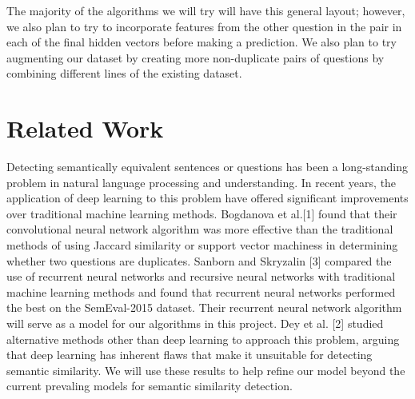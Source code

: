 \documentclass{article}
\begin{document}
\begin{center}
\end{center}
The majority of the algorithms we will try will have this general layout; however, we also plan to try to incorporate features from the other question in the pair in each of the final hidden vectors before making a prediction. We also plan to try augmenting our dataset by creating more non-duplicate pairs of questions by combining different lines of the existing dataset.

\section{Related Work}
Detecting semantically equivalent sentences or questions has been a long-standing problem in natural language processing and understanding. In recent years, the application of deep learning to this problem have offered significant improvements over traditional machine learning methods. Bogdanova et al.[1] found that their convolutional neural network algorithm was more effective than the traditional methods of using Jaccard similarity or support vector machiness in determining whether two questions are duplicates. Sanborn and Skryzalin [3] compared the use of recurrent neural networks and recursive neural networks with traditional machine learning methods and found that recurrent neural networks performed the best on the SemEval-2015 dataset. Their recurrent neural network algorithm will serve as a model for our algorithms in this project. Dey et al. [2] studied alternative methods other than deep learning to approach this problem, arguing that deep learning has inherent flaws that make it unsuitable for detecting semantic similarity. We will use these results to help refine our model beyond the current prevaling models for semantic similarity detection.
\end{document}
